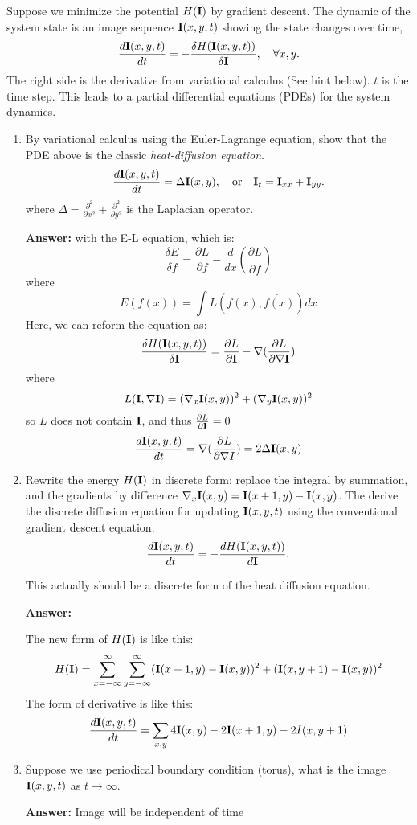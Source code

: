 \documentclass[11pt]{article}
\newcommand{\I}{{\bf I}}
\begin{document}
Suppose we minimize the potential $H(\I)$ by gradient descent. The dynamic of the system state is an image sequence $\I(x,y,t)$ showing the state changes over time, 
\[    \frac{d \I(x,y,t)}{d t } = - \frac{\delta H(\I(x,y,t))}{\delta
\I},  \quad \forall x,y.
\]
The right side  is the derivative from variational calculus (See hint below).  $t$ is the time step. This leads to a partial differential equations (PDEs) for the system dynamics.

\begin{enumerate}
\item By variational calculus using the Euler-Lagrange equation,  show
that the PDE above is the classic {\em heat-diffusion equation}.
\[
     \frac{d \I(x,y,t)}{d t} = \Delta \I(x,y), \quad {\rm or} \quad
     \I_t = \I_{xx}+\I_{yy}.
\]
where $\Delta=\frac{\partial^2}{\partial
x^2}+\frac{\partial^2}{\partial y^2}$ is the Laplacian operator.

\textbf{Answer:}
with the E-L equation, which is:
$$
\frac{\delta E}{\delta f} = \frac{\partial L}{\partial f} - \frac{d}{dx}(\frac{\partial L}{\partial \dot{f}})
$$
where
$$
E(f(x)) = \int L(f(x),\dot{f(x)})dx
$$
Here, we can reform the equation as:
$$
\frac{\delta H(\I(x,y,t))}{\delta \I}=\frac{\partial L}{\partial \I} - \nabla(\frac{\partial L}{\partial \nabla \I})
$$
where
$$
L(\I,\nabla\I)=(\nabla_x \I(x,y))^2 + (\nabla_y \I(x,y))^2
$$
so $L$ does not contain $\I$, and thus $\frac{\partial L}{\partial \I}=0$
$$
\frac{d\I(x,y,t)}{dt} = \nabla(\frac{\partial L}{\partial \nabla I}) = 2\Delta \I(x,y)
$$

\item Rewrite the energy $H(\I)$ in discrete form: replace the integral by summation,
and the gradients by difference $\nabla_x \I(x,y) = \I(x+1,
y)-\I(x,y)$. The derive the discrete diffusion equation for updating
$\I(x,y,t)$ using the conventional gradient descent equation.
\[   \frac{d \I(x,y,t)}{dt} = - \frac{dH(\I(x,y,t))}{d\I}. \]

This actually should be a discrete form of the heat diffusion equation.

\textbf{Answer:}

The new form of $H(\I)$ is like this:
$$
H(\I) = \sum_{x = -\infty}^{\infty}\sum_{y = -\infty}^{\infty}(\I(x+1,y)-\I(x,y))^2+(\I(x,y+1)-\I(x,y))^2
$$
The form of derivative is like this:
$$
\frac{d\I(x,y,t)}{dt} = \sum_{x,y}4\I(x,y)-2\I(x+1,y)-2I(x,y+1)
$$
\item Suppose we use periodical boundary condition (torus), what is
the image $\I(x,y, t)$ as $t \rightarrow \infty$.

\textbf{Answer:}
Image will be independent of time

 

\end{enumerate}
\end{document}
